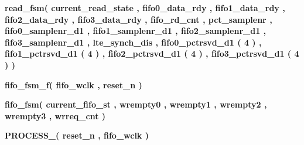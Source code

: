 \begin{DoxyCompactItemize}
{\bf read\+\_\+fsm}{\bfseries  ( {\bfseries {\bfseries {\bf current\+\_\+read\+\_\+state}} \textcolor{vhdlchar}{ }} , {\bfseries {\bfseries {\bf fifo0\+\_\+data\+\_\+rdy}} \textcolor{vhdlchar}{ }} , {\bfseries {\bfseries {\bf fifo1\+\_\+data\+\_\+rdy}} \textcolor{vhdlchar}{ }} , {\bfseries {\bfseries {\bf fifo2\+\_\+data\+\_\+rdy}} \textcolor{vhdlchar}{ }} , {\bfseries {\bfseries {\bf fifo3\+\_\+data\+\_\+rdy}} \textcolor{vhdlchar}{ }} , {\bfseries {\bfseries {\bf fifo\+\_\+rd\+\_\+cnt}} \textcolor{vhdlchar}{ }} , {\bfseries {\bfseries {\bf pct\+\_\+samplenr}} \textcolor{vhdlchar}{ }} , {\bfseries {\bfseries {\bf fifo0\+\_\+samplenr\+\_\+d1}} \textcolor{vhdlchar}{ }} , {\bfseries {\bfseries {\bf fifo1\+\_\+samplenr\+\_\+d1}} \textcolor{vhdlchar}{ }} , {\bfseries {\bfseries {\bf fifo2\+\_\+samplenr\+\_\+d1}} \textcolor{vhdlchar}{ }} , {\bfseries {\bfseries {\bf fifo3\+\_\+samplenr\+\_\+d1}} \textcolor{vhdlchar}{ }} , {\bfseries {\bfseries {\bf lte\+\_\+synch\+\_\+dis}} \textcolor{vhdlchar}{ }} , {\bfseries {\bfseries {\bf fifo0\+\_\+pctrsvd\+\_\+d1}} \textcolor{vhdlchar}{(}\textcolor{vhdlchar}{ } \textcolor{vhdldigit}{4} \textcolor{vhdlchar}{)}\textcolor{vhdlchar}{ }} , {\bfseries {\bfseries {\bf fifo1\+\_\+pctrsvd\+\_\+d1}} \textcolor{vhdlchar}{(}\textcolor{vhdlchar}{ } \textcolor{vhdldigit}{4} \textcolor{vhdlchar}{)}\textcolor{vhdlchar}{ }} , {\bfseries {\bfseries {\bf fifo2\+\_\+pctrsvd\+\_\+d1}} \textcolor{vhdlchar}{(}\textcolor{vhdlchar}{ } \textcolor{vhdldigit}{4} \textcolor{vhdlchar}{)}\textcolor{vhdlchar}{ }} , {\bfseries {\bfseries {\bf fifo3\+\_\+pctrsvd\+\_\+d1}} \textcolor{vhdlchar}{(}\textcolor{vhdlchar}{ } \textcolor{vhdldigit}{4} \textcolor{vhdlchar}{)}\textcolor{vhdlchar}{ }} )}
\item 
{\bf fifo\+\_\+fsm\+\_\+f}{\bfseries  ( {\bfseries {\bfseries {\bf fifo\+\_\+wclk}} \textcolor{vhdlchar}{ }} , {\bfseries {\bfseries {\bf reset\+\_\+n}} \textcolor{vhdlchar}{ }} )}
\item 
{\bf fifo\+\_\+fsm}{\bfseries  ( {\bfseries {\bfseries {\bf current\+\_\+fifo\+\_\+st}} \textcolor{vhdlchar}{ }} , {\bfseries {\bfseries {\bf wrempty0}} \textcolor{vhdlchar}{ }} , {\bfseries {\bfseries {\bf wrempty1}} \textcolor{vhdlchar}{ }} , {\bfseries {\bfseries {\bf wrempty2}} \textcolor{vhdlchar}{ }} , {\bfseries {\bfseries {\bf wrempty3}} \textcolor{vhdlchar}{ }} , {\bfseries {\bfseries {\bf wrreq\+\_\+cnt}} \textcolor{vhdlchar}{ }} )}
\item 
{\bf P\+R\+O\+C\+E\+S\+S\+\_}{\bfseries  ( {\bfseries {\bfseries {\bf reset\+\_\+n}} \textcolor{vhdlchar}{ }} , {\bfseries {\bfseries {\bf fifo\+\_\+wclk}} \textcolor{vhdlchar}{ }} )}

\end{DoxyCompactItemize}
